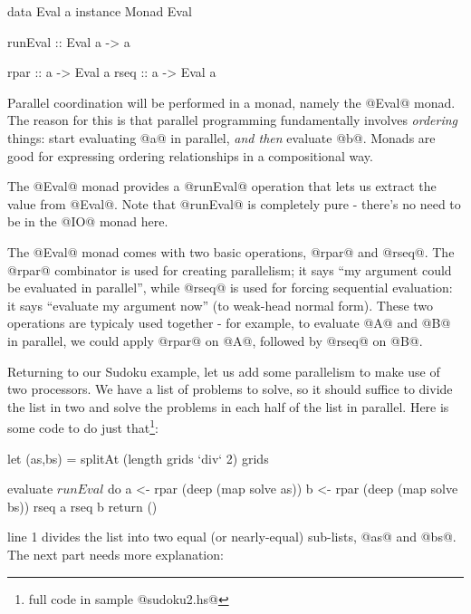 \begin{haskell}
data Eval a
instance Monad Eval

runEval :: Eval a -> a

rpar :: a -> Eval a
rseq :: a -> Eval a
\end{haskell}

\noindent Parallel coordination will be performed in a monad,
namely the @Eval@ monad.  The reason for this is that parallel
programming fundamentally involves \emph{ordering} things: start
evaluating @a@ in parallel, \emph{and then} evaluate @b@.  Monads are good
for expressing ordering relationships in a compositional way.

The @Eval@ monad provides a @runEval@ operation that lets us extract
the value from @Eval@.  Note that @runEval@ is completely pure -
there's no need to be in the @IO@ monad here.

The @Eval@ monad comes with two basic operations, @rpar@ and @rseq@.
The @rpar@ combinator is used for creating parallelism; it says ``my
argument could be evaluated in parallel'', while @rseq@ is used for
forcing sequential evaluation: it says ``evaluate my argument now''
(to weak-head normal form).  These two operations are typicaly used
together - for example, to evaluate @A@ and @B@ in parallel, we could
apply @rpar@ on @A@, followed by @rseq@ on @B@.

Returning to our Sudoku example, let us add some parallelism to make
use of two processors.  We have a list of problems to solve, so it
should suffice to divide the list in two and solve the problems in
each half of the list in parallel.  Here is some code to do just
that\footnote{full code in sample @sudoku2.hs@}:

\begin{numhaskell}
    let (as,bs) = splitAt (length grids `div` 2) grids

    evaluate $ runEval $ do
       a <- rpar (deep (map solve as))
       b <- rpar (deep (map solve bs))
       rseq a
       rseq b
       return ()
\end{numhaskell}

\noindent line 1 divides the list into two equal (or nearly-equal)
sub-lists, @as@ and @bs@.  The next part needs more explanation:

